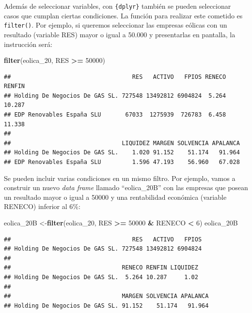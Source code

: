 \documentclass[
]{book}
\newenvironment{Shaded}{\begin{snugshade}}{\end{snugshade}}
\newcommand{\DecValTok}[1]{\textcolor[rgb]{0.00,0.00,0.81}{#1}}
\newcommand{\FunctionTok}[1]{\textcolor[rgb]{0.13,0.29,0.53}{\textbf{#1}}}
\newcommand{\NormalTok}[1]{#1}
\newcommand{\OtherTok}[1]{\textcolor[rgb]{0.56,0.35,0.01}{#1}}
\newcommand{\SpecialCharTok}[1]{\textcolor[rgb]{0.81,0.36,0.00}{\textbf{#1}}}
\begin{document}
Además de seleccionar variables, con \texttt{\{dplyr\}} también se pueden seleccionar casos que cumplan ciertas condiciones. La función para realizar este cometido es \texttt{filter()}. Por ejemplo, si queremos seleccionar las empresas eólicas con un resultado (variable RES) mayor o igual a 50.000 y presentarlas en pantalla, la instrucción será:

\begin{Shaded}
\begin{Highlighting}[]
\FunctionTok{filter}\NormalTok{(eolica\_20, RES }\SpecialCharTok{\textgreater{}=} \DecValTok{50000}\NormalTok{)}
\end{Highlighting}
\end{Shaded}

\begin{verbatim}
##                                   RES   ACTIVO   FPIOS RENECO RENFIN
## Holding De Negocios De GAS SL. 727548 13492812 6904824  5.264 10.287
## EDP Renovables España SLU       67033  1275939  726783  6.458 11.338
## 
##                                LIQUIDEZ MARGEN SOLVENCIA APALANCA
## Holding De Negocios De GAS SL.    1.020 91.152    51.174   91.964
## EDP Renovables España SLU         1.596 47.193    56.960   67.028
\end{verbatim}

Se pueden incluir varias condiciones en un mismo filtro. Por ejemplo, vamos a construir un nuevo \emph{data frame} llamado ``eolica\_20B'' con las empresas que posean un resultado mayor o igual a 50000 y una rentabilidad económica (variable RENECO) inferior al 6\%:

\begin{Shaded}
\begin{Highlighting}[]
\NormalTok{eolica\_20B }\OtherTok{\textless{}{-}}\FunctionTok{filter}\NormalTok{(eolica\_20, RES }\SpecialCharTok{\textgreater{}=} \DecValTok{50000} \SpecialCharTok{\&}\NormalTok{ RENECO }\SpecialCharTok{\textless{}} \DecValTok{6}\NormalTok{)}
\NormalTok{eolica\_20B}
\end{Highlighting}
\end{Shaded}

\begin{verbatim}
##                                   RES   ACTIVO   FPIOS
## Holding De Negocios De GAS SL. 727548 13492812 6904824
## 
##                                RENECO RENFIN LIQUIDEZ
## Holding De Negocios De GAS SL.  5.264 10.287     1.02
## 
##                                MARGEN SOLVENCIA APALANCA
## Holding De Negocios De GAS SL. 91.152    51.174   91.964
\end{verbatim}
\end{document}

